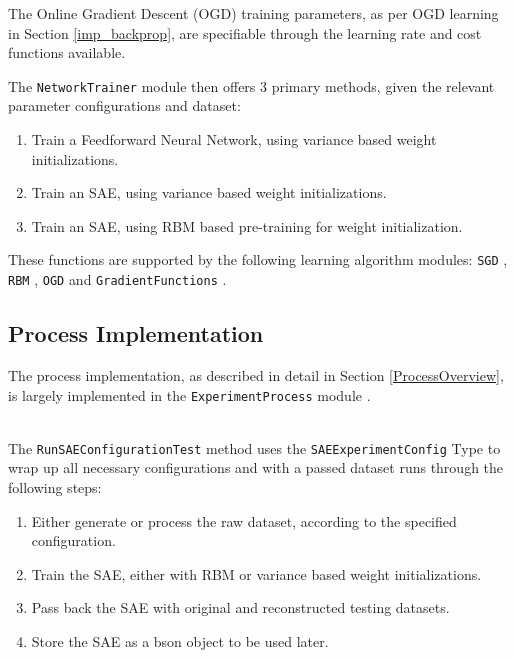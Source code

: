 \documentclass[a4paper,11pt,oneside]{article}
\theoremstyle{plain}
\theoremstyle{definition}
\begin{document}
	The Online Gradient Descent (OGD) training parameters, as per OGD learning in Section \ref{imp_backprop}, are specifiable through the learning rate and cost functions available.\newline
	
	The \texttt{NetworkTrainer} module \citep{DCNetworkTrainer} then offers 3 primary methods, given the relevant parameter configurations and dataset:
	
	\begin{enumerate}
		\item Train a Feedforward Neural Network, using variance based weight initializations.
		\item Train an SAE, using variance based weight initializations.
		\item Train an SAE, using RBM based pre-training for weight initialization.
	\end{enumerate}
	
	These functions are supported by the following learning algorithm modules: \texttt{SGD} \citep{DCSGD}, \texttt{RBM} \citep{DCRBM}, \texttt{OGD} \citep{DCOGD} and  \texttt{GradientFunctions} \citep{DCGradientFunctions}.
	
	\subsection{Process Implementation}
	
	The process implementation, as described in detail in Section \ref{ProcessOverview}, is largely implemented in the \texttt{ExperimentProcess} module \citep{DCExperimentProcess}.
	
	~\\
	The \texttt{RunSAEConfigurationTest} method uses the \texttt{SAEExperimentConfig} Type to wrap up all necessary configurations and with a passed dataset runs through the following steps:
	\begin{enumerate}
		\item Either generate or process the raw dataset, according to the specified configuration.
		\item Train the SAE, either with RBM or variance based weight initializations.
		\item Pass back the SAE with original and reconstructed testing datasets.
		\item Store the SAE as a bson object to be used later.
	\end{enumerate}
	
\end{document}
